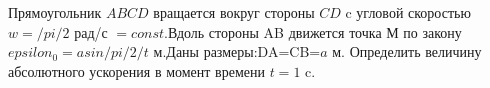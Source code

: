 Прямоугольник $ABCD$ вращается вокруг стороны $CD$ c угловой скоростью $w=/pi/2$ рад/с $=const$.Вдоль стороны AB движется точка М по закону $epsilon
_0=a sin/pi/2/t$ м.Даны размеры:DA=CB=$a$ м. Определить величину абсолютного ускорения в момент времени $t=1$ c.
 

